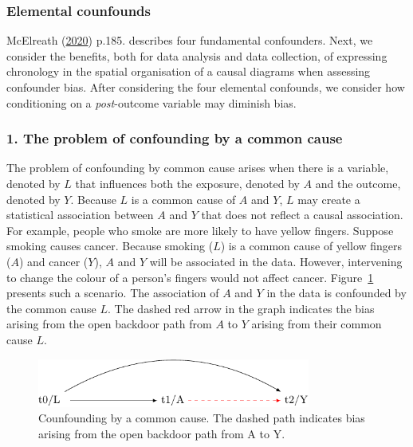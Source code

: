 \documentclass[
  singlecolumn]{article}
\begin{document}
\hypertarget{elemental-counfounds}{%
\subsubsection{Elemental counfounds}\label{elemental-counfounds}}

McElreath (\protect\hyperlink{ref-mcelreath2020}{2020}) p.185. describes
four fundamental confounders. Next, we consider the benefits, both for
data analysis and data collection, of expressing chronology in the
spatial organisation of a causal diagrams when assessing confounder
bias. After considering the four elemental confounds, we consider how
conditioning on a \emph{post}-outcome variable may diminish bias.

\hypertarget{the-problem-of-confounding-by-a-common-cause}{%
\subsubsection{1. The problem of confounding by a common
cause}\label{the-problem-of-confounding-by-a-common-cause}}

The problem of confounding by common cause arises when there is a
variable, denoted by \(L\) that influences both the exposure, denoted by
\(A\) and the outcome, denoted by \(Y.\) Because \(L\) is a common cause
of \(A\) and \(Y\), \(L\) may create a statistical association between
\(A\) and \(Y\) that does not reflect a causal association. For example,
people who smoke are more likely to have yellow fingers. Suppose smoking
causes cancer. Because smoking (\(L\)) is a common cause of yellow
fingers (\(A\)) and cancer (\(Y\)), \(A\) and \(Y\) will be associated
in the data. However, intervening to change the colour of a person's
fingers would not affect cancer. Figure~\ref{fig-dag-common-cause}
presents such a scenario. The association of \(A\) and \(Y\) in the data
is confounded by the common cause \(L\). The dashed red arrow in the
graph indicates the bias arising from the open backdoor path from \(A\)
to \(Y\) arising from their common cause \(L\).

\begin{figure}

{\centering \includegraphics[width=0.8\textwidth,height=\textheight]{causal-dags_files/figure-pdf/fig-dag-common-cause-1.pdf}

}

\caption{\label{fig-dag-common-cause}Counfounding by a common cause. The
dashed path indicates bias arising from the open backdoor path from A to
Y.}

\end{figure}
\end{document}
